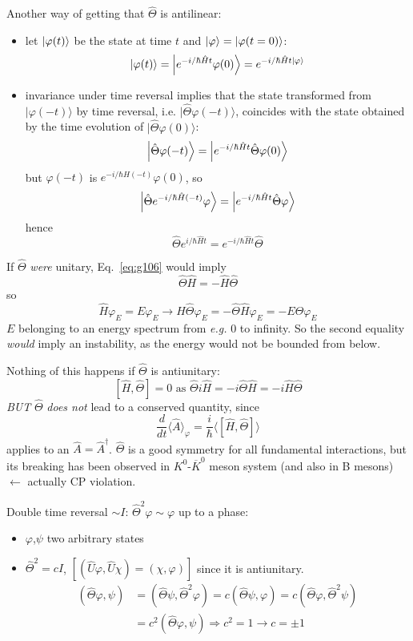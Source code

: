\documentclass[12pt]{article}
\newcommand{\be}{\begin{equation}}
\newcommand{\ee}{\end{equation}}
\begin{document}
Another way of getting that $\hat{\Theta}$ is antilinear:
\begin{itemize}
\item let $\ket{\varphi(t)}$ be the state at time $t$ and $\ket{\varphi} = \ket{\varphi(t=0)}$:
\be
\ket{\varphi(t)} = \ket{e^{-i/\hbar\hat{H}t}\varphi(0)} = e^{-i/\hbar\hat{H}t\ket{\varphi}}
\ee
%
\item invariance under time reversal implies that the
state transformed from $|\varphi(-t)\rangle$ by time reversal,
i.e. $|\hat{\Theta} \varphi(-t)\rangle$, coincides with the state obtained
by the time evolution of $|\hat{\Theta} \varphi(0)\rangle$:
\[
\ket{\hat{\Theta} \varphi(-t)} = \ket{e^{-i/\hbar\hat{H}t}\hat{\Theta}\varphi(0)}
\]
but $\varphi(-t)$ is $e^{-i/\hbar\hat{H}(-t)}\varphi(0)$, so
\[
\ket{\hat{\Theta} e^{-i/\hbar\hat{H}(-t)}\varphi} = \ket{e^{-i/\hbar\hat{H}t}\hat{\Theta}\varphi}
\]
hence
\be
\hat{\Theta}e^{i/\hbar\hat{H}t} = e^{-i/\hbar\hat{H}t}\hat{\Theta}
\label{eq:g106}
\ee
\end{itemize}
If $\hat{\Theta}$ \emph{were} unitary, Eq.~\eqref{eq:g106} would imply
\be
\hat{\Theta}\hat{H} = -\hat{H}\hat{\Theta}
\ee
so
\[
\hat{H}\varphi_E = E\varphi_E \to \hat{H}\hat{\Theta}\varphi_E 
= -\hat{\Theta}\hat{H}\varphi_E = -E\hat{\Theta}\varphi_E
\]
$E$ belonging to an energy spectrum 
from \textit{e.g.} 0 to infinity.
So the second equality 
\emph{would} imply an instability, 
as the energy would not be
bounded from below.


Nothing of this happens if $\hat{\Theta}$ is antiunitary:
\[
[\hat{H},\hat{\Theta}] = 0 \text{ as } 
\hat{\Theta}i\hat{H} = -i\hat{\Theta}\hat{H} = -i\hat{H}\hat{\Theta}
\]
\emph{BUT} $\hat{\Theta}$ \emph{does not} lead to a conserved quantity,
since
\be
\frac{d}{d t}\langle\hat{A}\rangle_{\varphi}=\frac{i}{\hbar}\langle[\hat{H}, \hat{\Theta}]\rangle
\ee
applies to an $\hat{A} = \hat{A}^{\dagger}$.
$\hat{\Theta}$ is a good symmetry for all fundamental interactions,
but its breaking has been observed in $K^0$-$\overline{K}^0$ meson
system (and also in B mesons) $\leftarrow$ actually CP violation.

Double time reversal $\sim I$: $\hat{\Theta}^2\varphi\sim\varphi$ up to a phase:
\begin{itemize}
\item $\varphi$,$\psi$ two arbitrary states
\item $\hat{\Theta}^2 = cI$, $[(\hat{U}\varphi,\hat{U}\chi) = (\chi,\varphi)]$ since it is antiunitary.
\be
\begin{aligned}
(\hat{\Theta} \varphi, \psi) 
&=\left(\hat{\Theta} \psi, \hat{\Theta}^{2} \varphi\right)=c(\hat{\Theta} \psi, \varphi)=c\left(\hat{\Theta} \varphi, \hat{\Theta}^{2} \psi\right) \\ 
&=c^{2}(\hat{\Theta} \varphi, \psi) \Rightarrow c^{2}=1 \rightarrow c=\pm 1
\end{aligned}
\label{eq:g109}
\ee
\end{itemize}
\end{document}
